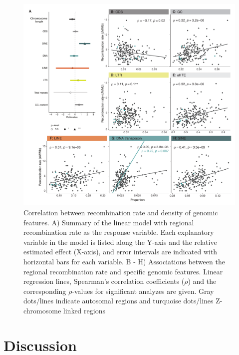 \documentclass[twocolumn]{bmcart}%
\begin{document}
\begin{figure}[tb]
    \centering
\includegraphics[width=1.99\linewidth]{ShipilinaNasvallFig5opt.pdf}
    \caption{Correlation between recombination rate and density of genomic features. A) Summary of the linear model with regional recombination rate as the response variable. Each explanatory variable in the model is listed along the Y-axis and the relative estimated effect (X-axis), and error intervals are indicated with horizontal bars for each variable. B - H) Associations between the regional recombination rate and specific genomic features. Linear regression lines, Spearman's correlation coefficients ($\rho$) and the corresponding $\rho$-values for significant analyzes are given. Gray dots/lines indicate autosomal regions and turquoise dots/lines Z-chromosome linked regions
}
    \label{fig:5}
\end{figure}


\section*{Discussion}
\end{document}
